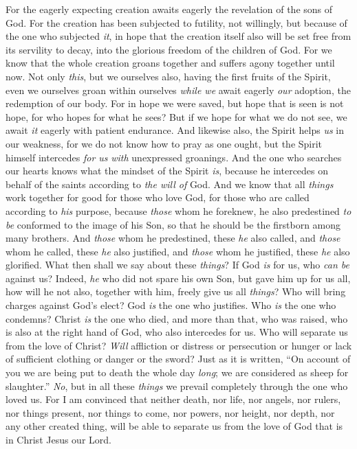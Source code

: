 \begin{biblechapter}
\verse For the eagerly expecting creation awaits eagerly the revelation of the sons of God.
\verse For the creation has been subjected to futility, not willingly, but because of the one who subjected \textit{it}, in hope
\verse that the creation itself also will be set free from its servility to decay, into the glorious freedom of the children of God.
\verse For we know that the whole creation groans together and suffers agony together until now.
\verse Not only \textit{this}, but we ourselves also, having the first fruits of the Spirit, even we ourselves groan within ourselves \textit{while we} await eagerly \textit{our} adoption, the redemption of our body.
\verse For in hope we were saved, but hope that is seen is not hope, for who hopes for what he sees?
\verse But if we hope for what we do not see, we await \textit{it} eagerly with patient endurance.
\verse And likewise also, the Spirit helps \textit{us} in our weakness, for we do not know how to pray as one ought, but the Spirit himself intercedes \textit{for us} \textit{with} unexpressed groanings.
\verse And the one who searches our hearts knows what the mindset of the Spirit \textit{is}, because he intercedes on behalf of the saints according to \textit{the will of} God.
\verse And we know that all \textit{things} work together for good for those who love God, for those who are called according to \textit{his} purpose,
\verse because \textit{those} whom he foreknew, he also predestined \textit{to be} conformed to the image of his Son, so that he should be the firstborn among many brothers.
\verse And \textit{those} whom he predestined, these \textit{he} also called, and \textit{those} whom he called, these \textit{he} also justified, and \textit{those} whom he justified, these \textit{he} also glorified.
 What then shall we say about these \textit{things}? If God \textit{is} for us, who \textit{can be} against us?
\verse Indeed, \textit{he} who did not spare his own Son, but gave him up for us all, how will he not also, together with him, freely give us all \textit{things}?
\verse Who will bring charges against God’s elect? God \textit{is} the one who justifies.
\verse Who \textit{is} the one who condemns? Christ \textit{is} the one who died, and more than that, who was raised, who is also at the right hand of God, who also intercedes for us.
\verse Who will separate us from the love of Christ? \textit{Will} affliction or distress or persecution or hunger or lack of sufficient clothing or danger or the sword?
\verse Just as it is written, “On account of you we are being put to death the whole day \textit{long}; 
we are considered as sheep for slaughter.”
\verse \textit{No}, but in all these \textit{things} we prevail completely through the one who loved us.
\verse For I am convinced that neither death, nor life, nor angels, nor rulers, nor things present, nor things to come, nor powers,
\verse nor height, nor depth, nor any other created thing, will be able to separate us from the love of God that is in Christ Jesus our Lord.
\end{biblechapter}

